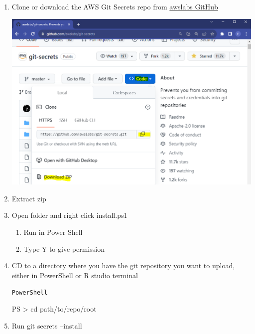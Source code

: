 \documentclass[
  letterpaper,
  DIV=11,
  numbers=noendperiod,
  oneside]{scrartcl}
\newenvironment{Shaded}{\begin{snugshade}}{\end{snugshade}}
\newcommand{\ExtensionTok}[1]{\textcolor[rgb]{0.00,0.23,0.31}{#1}}
\newcommand{\NormalTok}[1]{\textcolor[rgb]{0.00,0.23,0.31}{#1}}
\newcommand{\OperatorTok}[1]{\textcolor[rgb]{0.37,0.37,0.37}{#1}}
\providecommand{\tightlist}{%
  \setlength{\itemsep}{0pt}\setlength{\parskip}{0pt}}\usepackage{longtable,booktabs,array}
\begin{document}
\begin{enumerate}
\def\labelenumi{\arabic{enumi}.}
\item
  Clone or download the AWS Git Secrets repo from
  \href{https://github.com/awslabs/git-secrets/blob/master/install.ps1}{awslabs
  GitHub}

  \includegraphics{images/gh_secrets.PNG}
\item
  Extract zip
\item
  Open folder and right click install.ps1

  \begin{enumerate}
  \def\labelenumii{\alph{enumii}.}
  \tightlist
  \item
    Run in Power Shell
  \item
    Type Y to give permission
  \end{enumerate}
\item
  CD to a directory where you have the git repository you want to
  upload, either in PowerShell or R studio terminal 

  \begin{codelisting}

  \caption{\texttt{PowerShell}}

\begin{Shaded}
\begin{Highlighting}[]
\ExtensionTok{PS} \OperatorTok{\textgreater{}}\NormalTok{ cd path/to/repo/root}
\end{Highlighting}
\end{Shaded}

  \end{codelisting}
\item
  Run git secrets --install


\end{enumerate}
\end{document}
